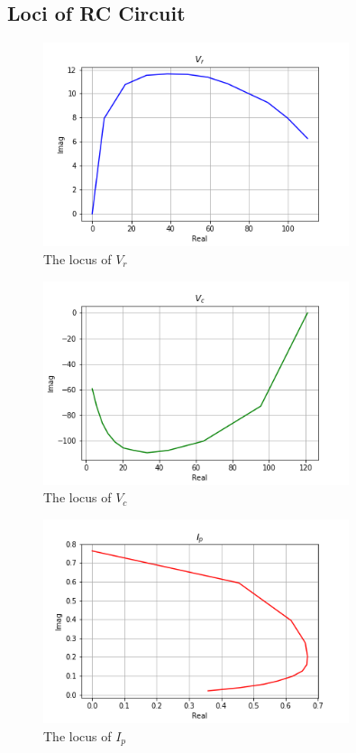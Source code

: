 \documentclass{article}
\begin{document}
  \subsection{Loci of RC Circuit}

    \begin{figure}[!h]
        \includegraphics[width=0.8\textwidth]{RC_V_r_locus}
        \centering
        \caption{The locus of $V_r$}
    \end{figure}
    \begin{figure}[!h]
        \includegraphics[width=0.8\textwidth]{RC_V_C_locus}
        \centering
        \caption{The locus of $V_c$}
    \end{figure}
    \begin{figure}[!h]
        \includegraphics[width=0.8\textwidth]{RC_I_p_locus}
        \centering
        \caption{The locus of $I_p$}
    \end{figure}
\end{document}
